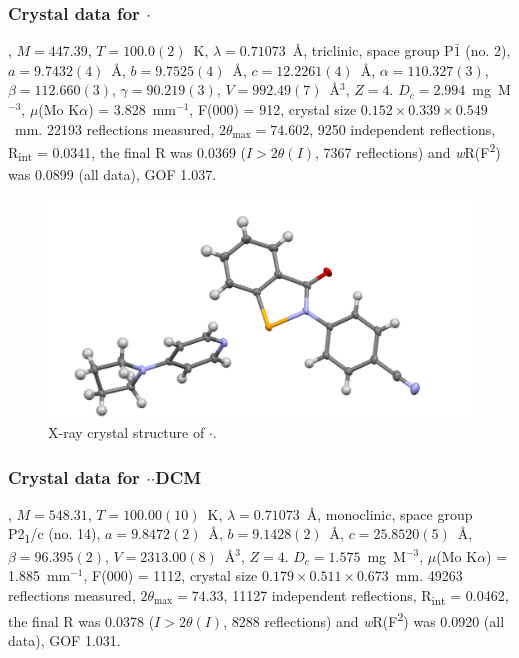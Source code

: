 \begin{refsection}
\subsubsection{Crystal data for \texorpdfstring{$ \cdot $}{C23 H20 N4 O Se}}
, $M=447.39$, $T=100.0(2)$~K, $ \lambda=0.71073 $~\AA, triclinic, space group P$\bar{1}$ (no. 2), $a = 9.7432(4)$~\AA, $b = 9.7525(4)$~\AA, $c = 12.2261(4)$~\AA, $\alpha = 110.327(3)$\degree, $\beta = 112.660(3)$\degree, $\gamma = 90.219(3)$\degree, $V = 992.49(7)$~\AA$^{3}$, $Z = 4$. $D_{c}= 2.994$~mg~M$^{-3}$, $\mu$(Mo K$\alpha$) = 3.828~mm$^{-1}$, F(000) = 912, crystal size $0.152 \times 0.339 \times 0.549$~mm. 22193 reflections measured, $2\theta_{\max}=74.602$\degree, 9250 independent reflections, R\textsubscript{int} = 0.0341, the final R was 0.0369 ($I > 2\theta(I)$, 7367 reflections) and \textit{w}R(F\textsuperscript{2}) was 0.0899 (all data), GOF 1.037.

\begin{figure}
  \includegraphics[width=0.6\linewidth]{Figures/ebs-4cn-pyrrol-xtal.pdf}
  \caption{X-ray crystal structure of \texorpdfstring{$ \cdot $}{C23 H20 N4 O Se}.}
\end{figure}

\subsubsection{Crystal data for \texorpdfstring{$ \cdot $$ \cdot $DCM}{C24 H22 Cl2 N4 O2 Se}}
, $M=548.31$, $T=100.00(10)$~K, $ \lambda=0.71073 $~\AA, monoclinic, space group P2\textsubscript{1}/c (no. 14), $a = 9.8472(2)$~\AA, $b = 9.1428(2)$~\AA, $c = 25.8520(5)$~\AA, $\beta = 96.395(2)$\degree, $V = 2313.00(8)$~\AA$^{3}$, $Z = 4$. $D_{c}= 1.575$~mg~M$^{-3}$, $\mu$(Mo K$\alpha$) = 1.885~mm$^{-1}$, F(000) = 1112, crystal size $0.179 \times 0.511 \times 0.673$~mm. 49263 reflections measured, $2\theta_{\max}=74.33$\degree, 11127 independent reflections, R\textsubscript{int} = 0.0462, the final R was 0.0378 ($I > 2\theta(I)$, 8288 reflections) and \textit{w}R(F\textsuperscript{2}) was 0.0920 (all data), GOF 1.031.


\end{refsection}
